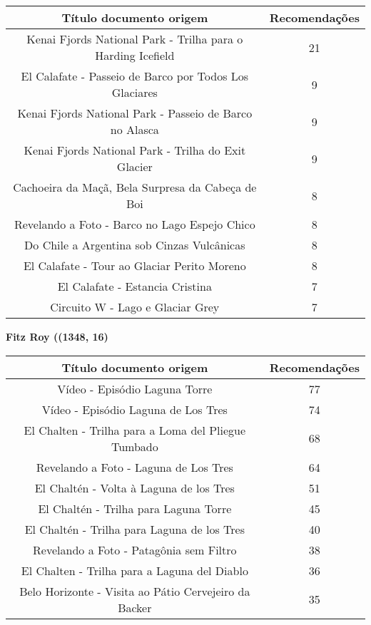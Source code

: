 \begin{center}
    \begin{tabular}{|c|c|}
        \hline
        \textbf{Título documento origem} & \textbf{Recomendações} \\
        \hline
        Kenai Fjords National Park - Trilha para o Harding Icefield & 21 \\
        \hline
        El Calafate - Passeio de Barco por Todos Los Glaciares & 9 \\
        \hline
         Kenai Fjords National Park - Passeio de Barco no Alasca & 9 \\
         \hline
         Kenai Fjords National Park - Trilha do Exit Glacier & 9 \\
         \hline
         Cachoeira da Maçã, Bela Surpresa da Cabeça de Boi & 8 \\
         \hline
         Revelando a Foto - Barco no Lago Espejo Chico & 8 \\
         \hline
         Do Chile a Argentina sob Cinzas Vulcânicas & 8 \\
         \hline
         El Calafate - Tour ao Glaciar Perito Moreno & 8 \\
         \hline
         El Calafate - Estancia Cristina & 7 \\
         \hline
         Circuito W - Lago e Glaciar Grey & 7 \\
        \hline
    \end{tabular}
\end{center}

\textbf{Fitz Roy ((1348, 16)}

\begin{center}
    \begin{tabular}{|c|c|}
        \hline
        \textbf{Título documento origem} & \textbf{Recomendações} \\
        \hline
        Vídeo - Episódio Laguna Torre & 77 \\
        \hline
        Vídeo - Episódio Laguna de Los Tres & 74 \\
        \hline
        El Chalten - Trilha para a Loma del Pliegue Tumbado & 68 \\
        \hline
        Revelando a Foto - Laguna de Los Tres & 64 \\
        \hline
        El Chaltén - Volta à Laguna de los Tres & 51 \\
        \hline
        El Chaltén - Trilha para Laguna Torre & 45 \\
        \hline
        El Chaltén - Trilha para Laguna de los Tres & 40 \\
        \hline
        Revelando a Foto - Patagônia sem Filtro & 38 \\
        \hline
        El Chalten - Trilha para a Laguna del Diablo & 36 \\
        \hline
        Belo Horizonte - Visita ao Pátio Cervejeiro da Backer & 35 \\
        \hline
    \end{tabular}
\end{center}